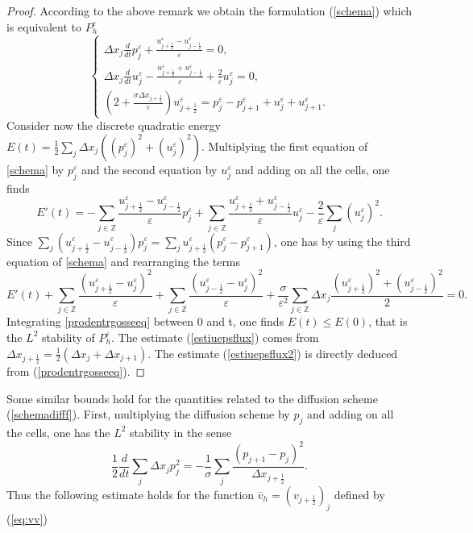 \documentclass[a4paper,french,english,10pt]{article}
\newcommand\eps{\varepsilon}
\begin{document}
\begin{proof}
According to the above remark we obtain  
the formulation 
(\ref{schema}) 
which is 
equivalent to $P_h^\eps$
\begin{equation}\label{schema}
\left\{
\begin{array}{lll}
\displaystyle\Delta x_j\frac{d}{dt}p^{\eps}_j +\frac{u_{j+\frac12 }^{\eps} -
u_{j-\frac12 }^{\eps} }{\eps} = 0,\\
\displaystyle\Delta x_j\frac{d}{dt}u^{\eps}_j-\frac{u_{j+\frac12 }^{\eps}+
u_{j-\frac12 }^{\eps}}{\eps} +\frac{2}{\eps}u_j^{\eps}=0, \\
\displaystyle 
\left( 2
+\frac{\sigma \Delta x_{j+\frac12}
 }{\eps}
\right) u_{j+\frac12 }^{\eps} 

=p^{\eps}_j-p^{\eps}_{j+1}+u^{\eps}_j+u^{\eps}_{j+1}
.
\end{array}
\right.
\end{equation}
Consider now the discrete quadratic energy
$E(t)=\frac12 \sum_j \Delta x_j ((p^{\eps}_j)^2+(u^{\eps}_j)^2)$.
 Multiplying the first equation of \eqref{schema} by $p_j^{\eps}$ and the second
equation by $u_j^{\eps}$ and adding on all the cells, one finds
\begin{equation*}
 E'(t)=-\sum_{j\in \mathbb{Z}} \frac{
u_{j+\frac12 }^{\eps}-u_{j-\frac12 }^{\eps}}{\eps}p^{\eps}_j + \sum_{j\in
\mathbb{Z}} \frac{
u_{j+\frac12 }^{\eps}+u_{j-\frac12 }^{\eps}}{\eps}u^{\eps}_j
-\frac{2}{\eps}\sum_j (u^{\eps}_j)^2.
\end{equation*}
Since $
\sum_{j}(
u_{j+\frac12 }^{\eps}-u_{j-\frac12 }^{\eps})p^{\eps}_j =
\sum_{j} u_{j+\frac12 }^{\eps}(p^{\eps}_j-p^{\eps}_{j+1})$, one
has  by using the third equation of \eqref{schema} and rearranging the
terms
\begin{equation}\label{prodentrgosseeq}
E'(t)+\sum_{j\in \mathbb{Z}} \frac{
(u_{j+\frac12 }^{\eps}-u^{\eps}_j)^2 }{\eps}+\sum_{j\in \mathbb{Z}} \frac{
(u_{j-\frac12 }^{\eps}-u^{\eps}_j)^2 }{\eps} +
\frac{\sigma}{\eps^2}\sum_{j\in \mathbb{Z}} \Delta x_{j}
\frac{(u_{j+\frac12 }^{\eps})^2+(u_{j-\frac12 }^{\eps})^2}{2}= 0.
\end{equation}
Integrating  \eqref{prodentrgosseeq} between 0 and t, one finds  $E(t)\leq E(0)$, that is the $L^2$ stability of $P_h^\eps$.
The estimate  (\ref{estiuepsflux}) 
comes from 
$\Delta x_{j+\frac12}=\frac12( \Delta x_{j}+\Delta x_{j+1})$. The estimate 
 (\ref{estiuepsflux2}) is directly deduced from
(\ref{prodentrgosseeq}).
\end{proof}


Some similar bounds hold 
for  the quantities related to the diffusion scheme (\ref{schemadifff}).
First, multiplying the diffusion scheme by $p_j$ and adding on all the cells,
one has the $L^2$ stability in the sense
\begin{equation*}
\frac12 \frac{d}{dt}\sum_j \Delta x_jp_j^2=-\frac{1}{\sigma}\sum_j
\frac{(p_{j+1}-p_j)^2}{\Delta x_{j+\frac12 }}.
\end{equation*}
Thus 
the following estimate holds for
 the function 
$\bar{v}_h=\left( v_{j+\frac12}  \right)_j$ defined by
(\ref{eq:vv})  
 
\end{document}
